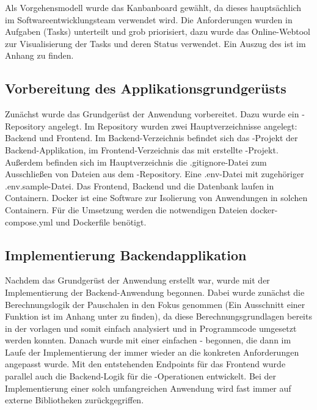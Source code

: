Als Vorgehensmodell wurde das Kanbanboard gewählt, da dieses hauptsächlich im Softwareentwicklungsteam verwendet wird. Die Anforderungen wurden in Aufgaben (Tasks) unterteilt und grob priorisiert, dazu wurde das Online-Webtool  zur Visualisierung der Tasks und deren Status verwendet.
Ein Auszug des  ist im Anhang zu finden.

\subsection{Vorbereitung des Applikationsgrundgerüsts}

Zunächst wurde das Grundgerüst der Anwendung vorbereitet. Dazu wurde ein -Repository angelegt. Im Repository wurden zwei Hauptverzeichnisse angelegt: Backend und Frontend. Im Backend-Verzeichnis befindet sich das -Projekt der Backend-Applikation, im Frontend-Verzeichnis das mit  erstellte  -Projekt. Außerdem befinden sich im Hauptverzeichnis die .gitignore-Datei zum Ausschließen von Dateien aus dem -Repository. Eine .env-Datei mit zugehöriger .env.sample-Datei. Das Frontend, Backend und die Datenbank laufen in Containern. Docker ist eine Software zur Isolierung von Anwendungen in solchen Containern. Für die Umsetzung werden die notwendigen Dateien docker-compose.yml und Dockerfile benötigt.

\subsection{Implementierung Backendapplikation}

Nachdem das Grundgerüst der Anwendung erstellt war, wurde mit der Implementierung der Backend-Anwendung begonnen. Dabei wurde zunächst die Berechnungslogik der Pauschalen in den Fokus genommen (Ein Ausschnitt einer Funktion ist im Anhang unter  zu finden), da diese Berechnungsgrundlagen bereits in der  vorlagen und somit einfach analysiert und in Programmcode umgesetzt werden konnten. Danach wurde mit einer einfachen - begonnen, die dann im Laufe der Implementierung der  immer wieder an die konkreten Anforderungen angepasst wurde. Mit den entstehenden Endpoints für das Frontend wurde parallel auch die Backend-Logik für die -Operationen entwickelt. Bei der Implementierung einer solch umfangreichen Anwendung wird fast immer auf externe Bibliotheken zurückgegriffen.

